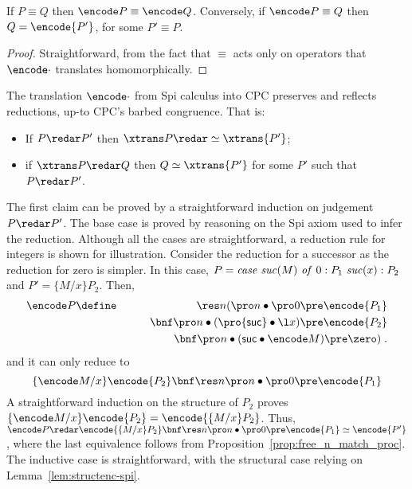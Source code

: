 \documentclass{LMCS}
\renewcommand{\beq}{\simeq}
\begin{document}
\begin{lem}
\label{lem:structenc-spi}
If $P \equiv Q$ then $\encode P \equiv \encode Q$.
Conversely, if $\encode P \equiv Q$ then $Q = \encode{P'}$, for some $P' \equiv P$.
\end{lem}
\begin{proof}
Straightforward, from the fact that $\equiv$ acts only on operators that $\encode\cdot$ translates homomorphically.
\end{proof}

\begin{thm}
\label{spi2cpc-red}
The translation $\encode\cdot$ from Spi calculus into CPC preserves and reflects reductions, up-to CPC's barbed
congruence. That is:
\begin{itemize}
	\item If $P\redar P'$ then $\xtrans P \redar \beq \xtrans {P'}$;
	\item if $\xtrans P \redar Q$ then $Q \beq \xtrans {P'}$ for some $P'$ such that $P\redar P'$.
\end{itemize}
\end{thm}
\proof
The first claim can be proved by a straightforward induction
on judgement $P \redar P'$. The base case is proved by reasoning on the Spi axiom used to infer the reduction.
Although all the cases are straightforward, a reduction rule for integers is shown for illustration.
Consider the reduction for a successor as the reduction for zero is simpler.
In this case, $P = {\it case}\ {\it suc}(M)\ {\it of}\ 0:P_1\ {\it suc}(x):P_2$
and $P' = \{M/x\}P_2$. Then, 
\begin{eqnarray*}
\encode P &\define& 
			\res n (\pro n\bullet \pro 0\pre \encode {P_1} \\
	& & \quad\quad	\bnf	\pro n\bullet (\pro {{\sf suc}}\bullet \l x)\pre \encode {P_2}\\
	& & \quad\quad	\bnf	\pro n\bullet ({\sf suc} \bullet \encode M) \pre \zero) \; .
\end{eqnarray*}
and it can only reduce to
$$
\{\encode M / x\}\encode{P_2} \bnf \res n \pro n\bullet \pro 0\pre \encode {P_1}
$$
A straightforward induction on the structure of $P_2$ proves
$\{\encode M / x\}\encode{P_2} = \encode{\{M / x\}P_2}$. Thus,
$\encode P \redar \encode{\{M / x\}P_2}\bnf
\res n \pro n\bullet \pro 0\pre \encode {P_1} \beq \encode{P'}$,
where the last equivalence follows from Proposition~\ref{prop:free_n_match_proc}.
The inductive case is straightforward, with the structural case relying on Lemma~\ref{lem:structenc-spi}.
\end{document}
